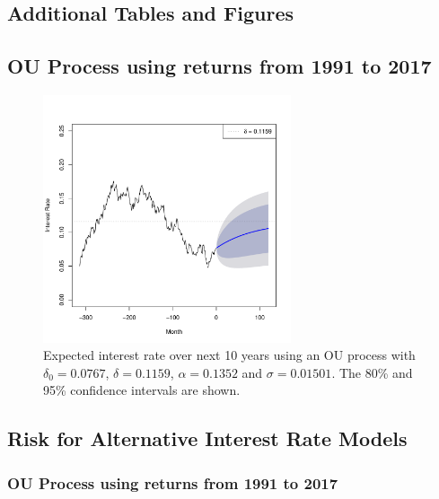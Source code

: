 \documentclass[12pt]{article}
\begin{document}
\begin{appendices}

\section{Additional Tables and Figures}

\subsection{OU Process using returns from 1991 to 2017}

\begin{figure}[ht]
\begin{center}
\vspace{-12.5mm}
\includegraphics[width=0.65\textwidth]{images/arforecast1991}
\end{center}
\vspace{-2.5mm}
\caption{Expected interest rate over next 10 years using an OU process with $\delta_{0} = 0.0767$, $\delta = 0.1159$, $\alpha = 0.1352$ and $\sigma = 0.01501$. The 80\% and 95\% confidence intervals are shown.}
\label{fig:ouforecast1991}
\end{figure}

\subsection{Risk for Alternative Interest Rate Models}

\subsubsection{OU Process using returns from 1991 to 2017}


\end{appendices}
\end{document}
